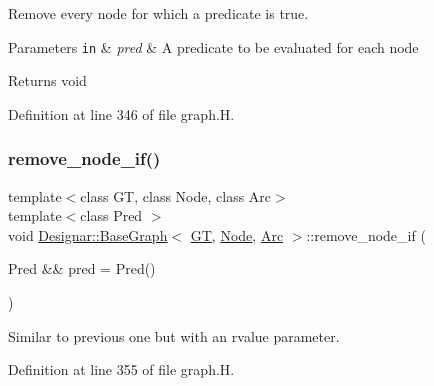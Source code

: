 Remove every node for which a predicate is true. 


\begin{DoxyParams}[1]{Parameters}
\mbox{\tt in}  & {\em pred} & A predicate to be evaluated for each node \\
\hline
\end{DoxyParams}
\begin{DoxyReturn}{Returns}
void 
\end{DoxyReturn}


Definition at line 346 of file graph.\+H.

\mbox{\label{class_designar_1_1_base_graph_a6e63659d272255254f6abc29c1e09724}} 
\subsubsection{\texorpdfstring{remove\+\_\+node\+\_\+if()}{remove\_node\_if()}\hspace{0.1cm}{\footnotesize\ttfamily [2/2]}}
{\footnotesize\ttfamily template$<$class GT, class Node, class Arc$>$ \\
template$<$class Pred $>$ \\
void \hyperlink{class_designar_1_1_base_graph}{Designar\+::\+Base\+Graph}$<$ \hyperlink{demo-buildgraph_8_c_a3001c40d2c31ca87ed96cd7d1334a55e}{GT}, \hyperlink{namespace_designar_a5af326c65aa2bd26b26c410f2030d09e}{Node}, \hyperlink{namespace_designar_a3f55fb5513d62ff47cbc8f72b8e95d6f}{Arc} $>$\+::remove\+\_\+node\+\_\+if (\begin{DoxyParamCaption}\item[{Pred \&\&}]{pred = {\ttfamily Pred()} }\end{DoxyParamCaption})\hspace{0.3cm}{\ttfamily [inline]}}



Similar to previous one but with an rvalue parameter. 



Definition at line 355 of file graph.\+H.

\mbox{\label{class_designar_1_1_base_graph_ab73705a167e91d0982a9f149b1d7e71b}} 
